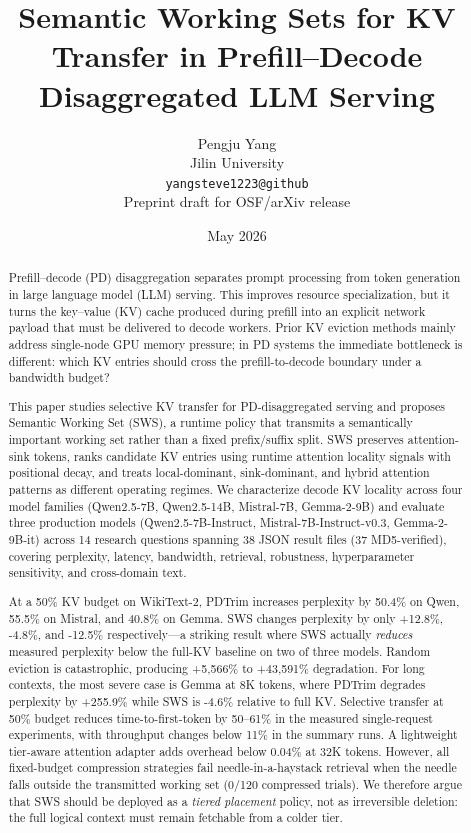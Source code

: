 \documentclass[11pt]{article}
\title{Semantic Working Sets for KV Transfer in Prefill--Decode Disaggregated LLM Serving}
\author{Pengju Yang\\
Jilin University\\
\texttt{yangsteve1223@github}\\[0.5em]
\small Preprint draft for OSF/arXiv release}
\date{May 2026}
\newcommand{\method}{SWS}
\newcommand{\fullmethod}{Semantic Working Set}
\newcommand{\pct}{\%}
\theoremstyle{definition}
\theoremstyle{plain}
\begin{document}
\maketitle

\begin{abstract}
Prefill--decode (PD) disaggregation separates prompt processing from token generation in large language model (LLM) serving.  This improves resource specialization, but it turns the key--value (KV) cache produced during prefill into an explicit network payload that must be delivered to decode workers.  Prior KV eviction methods mainly address single-node GPU memory pressure; in PD systems the immediate bottleneck is different: which KV entries should cross the prefill-to-decode boundary under a bandwidth budget?

This paper studies selective KV transfer for PD-disaggregated serving and proposes \fullmethod{} (\method{}), a runtime policy that transmits a semantically important working set rather than a fixed prefix/suffix split.  \method{} preserves attention-sink tokens, ranks candidate KV entries using runtime attention locality signals with positional decay, and treats local-dominant, sink-dominant, and hybrid attention patterns as different operating regimes.  We characterize decode KV locality across four model families (Qwen2.5-7B, Qwen2.5-14B, Mistral-7B, Gemma-2-9B) and evaluate three production models (Qwen2.5-7B-Instruct, Mistral-7B-Instruct-v0.3, Gemma-2-9B-it) across 14 research questions spanning 38 JSON result files (37 MD5-verified), covering perplexity, latency, bandwidth, retrieval, robustness, hyperparameter sensitivity, and cross-domain text.

At a 50\pct{} KV budget on WikiText-2, PDTrim increases perplexity by 50.4\pct{} on Qwen, 55.5\pct{} on Mistral, and 40.8\pct{} on Gemma.  \method{} changes perplexity by only +12.8\pct{}, -4.8\pct{}, and -12.5\pct{} respectively---a striking result where \method{} actually \emph{reduces} measured perplexity below the full-KV baseline on two of three models.  Random eviction is catastrophic, producing +5{,}566\pct{} to +43{,}591\pct{} degradation.  For long contexts, the most severe case is Gemma at 8K tokens, where PDTrim degrades perplexity by +255.9\pct{} while \method{} is -4.6\pct{} relative to full KV.  Selective transfer at 50\pct{} budget reduces time-to-first-token by 50--61\pct{} in the measured single-request experiments, with throughput changes below 11\pct{} in the summary runs.  A lightweight tier-aware attention adapter adds overhead below 0.04\pct{} at 32K tokens.  However, all fixed-budget compression strategies fail needle-in-a-haystack retrieval when the needle falls outside the transmitted working set (0/120 compressed trials).  We therefore argue that \method{} should be deployed as a \emph{tiered placement} policy, not as irreversible deletion: the full logical context must remain fetchable from a colder tier.
\end{abstract}
\end{document}
